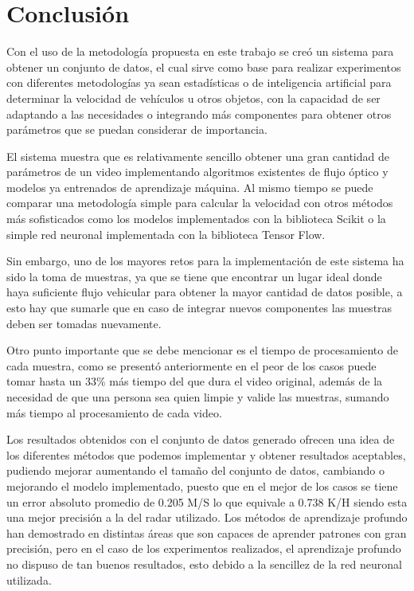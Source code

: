 \section{Conclusión}

Con el uso de la metodología propuesta en este trabajo se creó un sistema para obtener un conjunto de datos, el cual sirve como base para realizar experimentos con diferentes metodologías ya sean estadísticas o de inteligencia artificial para determinar la velocidad de vehículos u otros objetos, con la capacidad de ser adaptando a las necesidades o integrando más componentes para obtener otros parámetros que se puedan considerar de importancia.

El sistema muestra que es relativamente sencillo obtener una gran cantidad de parámetros de un video implementando algoritmos existentes de flujo óptico y modelos ya entrenados de aprendizaje máquina. Al mismo tiempo se puede comparar una metodología simple para calcular la velocidad con otros métodos más sofisticados como los modelos implementados con la biblioteca Scikit o la simple red neuronal implementada con la biblioteca Tensor Flow.

Sin embargo, uno de los mayores retos para la implementación de este sistema ha sido la toma de muestras, ya que se tiene que encontrar un lugar ideal donde haya suficiente flujo vehicular para obtener la mayor cantidad de datos posible, a esto hay que sumarle que en caso de integrar nuevos componentes las muestras deben ser tomadas nuevamente.

Otro punto importante que se debe mencionar es el tiempo de procesamiento de cada muestra, como se presentó anteriormente en el peor de los casos puede tomar hasta un 33\% más tiempo del que dura el video original, además de la necesidad de que una persona sea quien limpie y valide las muestras, sumando más tiempo al procesamiento de cada video.

Los resultados obtenidos con el conjunto de datos generado ofrecen una idea de los diferentes métodos que podemos implementar y obtener resultados aceptables, pudiendo mejorar aumentando el tamaño del conjunto de datos, cambiando o mejorando el modelo implementado, puesto que en el mejor de los casos se tiene un error absoluto promedio de 0.205 M/S lo que equivale a 0.738 K/H siendo esta una mejor precisión a la del radar utilizado. Los métodos de aprendizaje profundo han demostrado en distintas áreas que son capaces de aprender patrones con gran precisión, pero en el caso de los experimentos realizados, el aprendizaje profundo no dispuso de tan buenos resultados, esto debido a la sencillez de la red neuronal utilizada.
